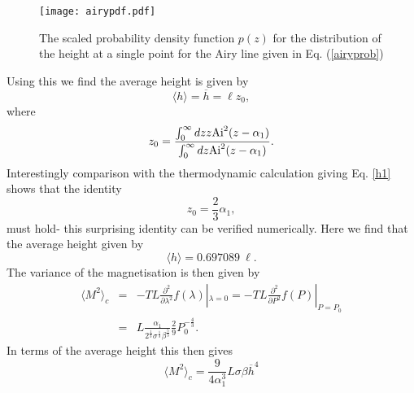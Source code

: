  \begin{figure}[t]
\begin{center}
\texttt{[image: airypdf.pdf]}
\caption{The scaled probability density function $p(z)$ for the distribution of the height at
a single point for the Airy line given in Eq. (\ref{airyprob})}
\label{1dpot}
\end{center}
\end{figure}
Using this we find the average height is given by
\begin{equation}
\langle h\rangle = \overline h= \ell z_0,
\end{equation}
where 
\begin{equation}
z_0 = \frac{\int_0^\infty dz z {\rm Ai}^2(z-\alpha_1)}{\int_0^\infty dz {\rm Ai}^2(z-\alpha_1)}.
\end{equation}
Interestingly comparison with the thermodynamic calculation giving Eq. \eqref{h1} shows that the identity
\begin{equation}
z_0 = \frac{2}{3}\alpha_1,
\end{equation}
must hold- this surprising identity can be verified numerically. Here we find that the average height given by
\begin{equation}
\langle h\rangle= 0.697089 \ \ell.
\end{equation}
The variance of the magnetisation is then given by
\begin{eqnarray}
\langle M^2\rangle_c &=& -TL\frac{\partial^2}{\partial \lambda^2}f (\lambda)|_{\lambda=0}=-TL\frac{\partial^2}{\partial P^2}f (P)|_{P=P_0}\\
&=& L\frac{\alpha_1 }{2^\frac{1}{3} \sigma^\frac{1}{3}\beta^\frac{5}{3}}\frac{2}{9}P_0^{-\frac{4}{3}}.
\end{eqnarray}
In terms of the average height this then gives
\begin{equation}
\langle M^2\rangle_c = \frac{9}{4\alpha_1^3}L\sigma\beta \overline h^4
\end{equation}


